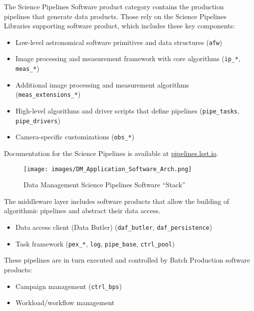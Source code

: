 \documentclass[DM,toc]{lsstdoc}
\begin{document}
The Science Pipelines Software product category contains the production pipelines that generate data products.
Those rely on the Science Pipelines Libraries supporting software product, which includes these key components:
\begin{itemize}
\item
  Low-level astronomical software primitives and data structures
  (\texttt{afw})
\item
  Image processing and measurement framework with core algorithms
  (\texttt{ip\_*}, \texttt{meas\_*})
\item
  Additional image processing and measurement algorithms
  (\texttt{meas\_extensions\_*})
\item
  High-level algorithms and driver scripts that define pipelines
  (\texttt{pipe\_tasks}, \texttt{pipe\_drivers})
\item
  Camera-specific customizations (\texttt{obs\_*})
\end{itemize}
Documentation for the Science Pipelines is available at \href{https://pipelines.lsst.io/}{pipelines.lsst.io}.

\begin{figure}
\centering
\texttt{[image: images/DM\_Application\_Software\_Arch.png]}
\caption{Data Management Science Pipelines Software ``Stack''}
\label{fig:scipi}
\end{figure}

The middleware layer includes software products that allow the building of algorithmic pipelines and abstract their data access.
\begin{itemize}
\item
  Data access client (Data Butler) (\texttt{daf\_butler}, \texttt{daf\_persistence})
\item
  Task framework (\texttt{pex\_*}, \texttt{log}, \texttt{pipe\_base}, \texttt{ctrl\_pool})
\end{itemize}

These pipelines are in turn executed and controlled by Batch Production software products:
\begin{itemize}
\item
  Campaign management (\texttt{ctrl\_bps})
\item
  Workload/workflow management
\end{itemize}
\end{document}
